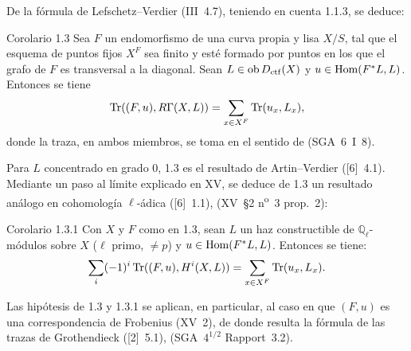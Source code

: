 De la fórmula de Lefschetz--Verdier (III~4.7), teniendo en cuenta 1.1.3, se deduce:

\begin{statement}{Corolario 1.3}
Sea $F$ un endomorfismo de una curva propia y lisa $X/S$, tal que el esquema de puntos fijos $X^F$ sea finito y esté formado por puntos en los que el grafo de $F$ es transversal a la diagonal. Sean $L\in\operatorname{ob} D_{\mathrm{ctf}}(X)$ y $u\in\operatorname{Hom}(F^*L,L)$. Entonces se tiene
\[
\operatorname{Tr}((F,u),R\Gamma(X,L))=\sum_{x\in X^F}\operatorname{Tr}(u_x,L_x),
\]
donde la traza, en ambos miembros, se toma en el sentido de (SGA~6~I~8).
\end{statement}

Para $L$ concentrado en grado $0$, 1.3 es el resultado de Artin--Verdier ([6]~4.1). Mediante un paso al límite explicado en XV, se deduce de 1.3 un resultado análogo en cohomología $\ell$-ádica ([6]~1.1), (XV~\S2 n\textsuperscript{o}~3 prop.~2):

\begin{statement}{Corolario 1.3.1}
Con $X$ y $F$ como en 1.3, sean $L$ un haz constructible de $\mathbb Q_\ell$-módulos sobre $X$ ($\ell$ primo, $\ne p$) y $u\in\operatorname{Hom}(F^*L,L)$. Entonces se tiene:
\[
\sum_i(-1)^i\operatorname{Tr}((F,u),H^i(X,L))=\sum_{x\in X^F}\operatorname{Tr}(u_x,L_x).
\]
\end{statement}

Las hipótesis de 1.3 y 1.3.1 se aplican, en particular, al caso en que $(F,u)$ es una correspondencia de Frobenius (XV~2), de donde resulta la fórmula de las trazas de Grothendieck ([2]~5.1), (SGA~$4^{1/2}$ Rapport~3.2).
